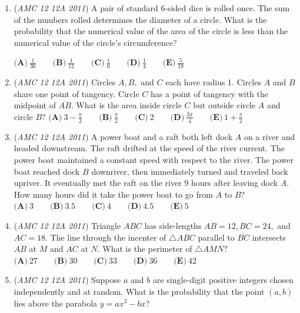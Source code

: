 \begin{enumerate}
 $\textbf{(A)}\ 324 \qquad \textbf{(B)}\ 441 \qquad \textbf{(C)}\ 630 \qquad \textbf{(D)}\ 648 \qquad \textbf{(E)}\ 882$


	\item (\textit{AMC 12 12A 2011}) A pair of standard $6$-sided dice is rolled once. The sum of the numbers rolled determines the diameter of a circle. What is the probability that the numerical value of the area of the circle is less than the numerical value of the circle's circumference?


 $\textbf{(A)}\ \frac{1}{36} \qquad \textbf{(B)}\ \frac{1}{12} \qquad \textbf{(C)}\ \frac{1}{6} \qquad \textbf{(D)}\ \frac{1}{4} \qquad \textbf{(E)}\ \frac{5}{18}$


	\item (\textit{AMC 12 12A 2011}) Circles $A, B,$ and $C$ each have radius 1. Circles $A$ and $B$ share one point of tangency. Circle $C$ has a point of tangency with the midpoint of $\overline{AB}.$ What is the area inside circle $C$ but outside circle $A$ and circle $B?$
$\textbf{(A)}\ 3 - \frac{\pi}{2} \qquad \textbf{(B)}\ \frac{\pi}{2} \qquad \textbf{(C)}\  2 \qquad \textbf{(D)}\ \frac{3\pi}{4} \qquad \textbf{(E)}\ 1+\frac{\pi}{2}$


	\item (\textit{AMC 12 12A 2011}) A power boat and a raft both left dock $A$ on a river and headed downstream. The raft drifted at the speed of the river current. The power boat maintained a constant speed with respect to the river. The power boat reached dock $B$ downriver, then immediately turned and traveled back upriver. It eventually met the raft on the river 9 hours after leaving dock $A.$ How many hours did it take the power boat to go from $A$ to $B?$
$\textbf{(A)}\ 3 \qquad \textbf{(B)}\ 3.5 \qquad \textbf{(C)}\  4 \qquad \textbf{(D)}\ 4.5 \qquad \textbf{(E)}\ 5$


	\item (\textit{AMC 12 12A 2011}) Triangle $ABC$ has side-lengths $AB = 12, BC = 24,$ and $AC = 18.$ The line through the incenter of $\triangle ABC$ parallel to $\overline{BC}$ intersects $\overline{AB}$ at $M$ and $\overline{AC}$ at $N.$ What is the perimeter of $\triangle AMN?$
$\textbf{(A)}\ 27 \qquad \textbf{(B)}\ 30 \qquad \textbf{(C)}\  33 \qquad \textbf{(D)}\ 36 \qquad \textbf{(E)}\ 42$


	\item (\textit{AMC 12 12A 2011}) Suppose $a$ and $b$ are single-digit positive integers chosen independently and at random. What is the probability that the point $(a,b)$ lies above the parabola $y=ax^2-bx$?



\end{enumerate}
